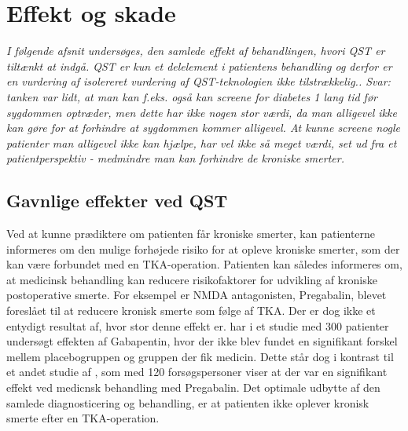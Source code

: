 \section{Effekt og skade}
\textit{I følgende afsnit undersøges, den samlede effekt af behandlingen, hvori QST er tiltænkt at indgå. QST er kun et delelement i patientens behandling og derfor er en vurdering af isolereret vurdering af QST-teknologien ikke tilstrækkelig.. Svar: tanken var lidt, at man kan f.eks. også kan screene for diabetes 1 lang tid før sygdommen optræder, men dette har ikke nogen stor værdi, da man alligevel ikke kan gøre for at forhindre at sygdommen kommer alligevel. At kunne screene nogle patienter man alligevel ikke kan hjælpe, har vel ikke så meget værdi, set ud fra et patientperspektiv - medmindre man kan forhindre de kroniske smerter.}

\subsection{Gavnlige effekter ved QST} 
Ved at kunne prædiktere om patienten får kroniske smerter, kan patienterne informeres om den mulige forhøjede risiko for at opleve kroniske smerter, som der kan være forbundet med en TKA-operation. Patienten kan således informeres om, at medicinsk behandling kan reducere risikofaktorer for udvikling af kroniske postoperative smerte.%
For eksempel er NMDA antagonisten, Pregabalin, blevet foreslået til at reducere kronisk smerte som følge af TKA. Der er dog ikke et entydigt resultat af, hvor stor denne effekt er.  har i et studie med 300 patienter undersøgt effekten af Gabapentin, hvor der ikke blev fundet en signifikant forskel mellem placebogruppen og gruppen der fik medicin. Dette står dog i kontrast til et andet studie af , som med 120 forsøgspersoner viser at der var en signifikant effekt ved medicnsk behandling med Pregabalin. 
Det optimale udbytte af den samlede diagnosticering og behandling, er at patienten ikke oplever kronisk smerte efter en TKA-operation. %

